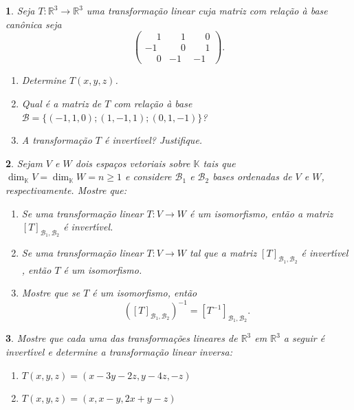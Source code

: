 \documentclass[12pt]{exam}
\newtheorem{exercicio}{}
\newcommand{\real}{\mathbb{R}}
\newcommand{\cp}[1]{\mathbb{#1}}
\begin{document}
\begin{exercicio}
  Seja $T : \real^3 \to \real^3$ uma transforma\c{c}\~ao linear cuja matriz com rela\c{c}\~ao \`a base can\^onica seja
  \[
    \begin{pmatrix}
      \phantom{-}1 & \phantom{-}1 & \phantom{-}0\\
      -1 & \phantom{-}0 & \phantom{-}1\\
      \phantom{-}0 & -1 & -1
    \end{pmatrix}.
  \]
    \begin{enumerate}[label=({\alph*})]
      \item Determine $T(x,y,z)$.
      \item Qual \'e a matriz de $T$ com rela\c{c}\~ao \`a base $\mathcal{B} = \{(-1,1,0);(1,-1,1);(0,1,-1)\}$?
      \item A transforma\c{c}\~ao $T$ \'e invert{\'\i}vel? Justifique.
    \end{enumerate}
\end{exercicio}

\begin{exercicio}
  Sejam $V$ e $W$ dois espa\c{c}os vetoriais sobre $\cp{K}$ tais que $\dim_\cp{K}V = \dim_\cp{K}W = n \ge 1$ e considere $\mathcal{B}_1$ e $\mathcal{B}_2$ bases ordenadas de $V$ e $W$, respectivamente. Mostre que:
  \begin{enumerate}[label=({\alph*})]
    \item Se uma transforma\c{c}\~ao linear $T : V \to W$ \'e um isomorfismo, ent\~ao a matriz $[T]_{\mathcal{B}_1,\mathcal{B}_2}$ \'e invert{\'\i}vel.
    \item Se uma transforma\c{c}\~ao linear $T : V \to W$ tal que a matriz $[T]_{\mathcal{B}_1,\mathcal{B}_2}$ \'e invert{\'\i}vel , ent\~ao $T$ \'e um isomorfismo.
    \item Mostre que se $T$ \'e um isomorfismo, ent\~ao
    \[
      \left([T]_{\mathcal{B}_1,\mathcal{B}_2}\right)^{-1} = [T^{-1}]_{\mathcal{B}_1,\mathcal{B}_2}.
    \]
  \end{enumerate}
\end{exercicio}

\begin{exercicio}
  Mostre que cada uma das transforma\c{c}\~oes lineares de $\real^3$ em $\real^3$ a seguir \'e invert{\'\i}vel e determine a transforma\c{c}\~ao linear inversa:
  \begin{enumerate}[label=({\alph*})]
    \item $T(x,y,z) = (x - 3y - 2z, y - 4z, -z)$
    \item $T(x,y,z) = (x, x - y, 2x + y -z)$
  \end{enumerate}
\end{exercicio}
\end{document}

